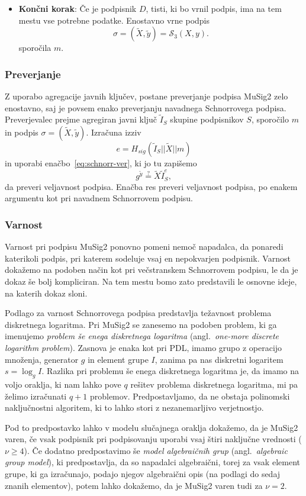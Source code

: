 \documentclass[isrm2, tisk]{fmfdelo}
\begin{document}
\begin{itemize}
    \item \textbf{Končni korak}:
        Če je podpisnik $D$, tisti, ki bo vrnil podpis, ima na tem mestu vse potrebne podatke.
        Enostavno vrne podpis
        $$
        \sigma = (\tilde{X}, \tilde{y}) = \mathcal{S}_3(X, y).
        $$
        sporočila $m$.
\end{itemize}

\subsubsection{Preverjanje}
Z uporabo agregacije javnih ključev, postane preverjanje podpisa MuSig2 zelo enostavno, saj je
povsem enako preverjanju navadnega Schnorrovega podpisa. Preverjevalec prejme agregiran javni ključ
$\tilde{I}_S$ skupine podpisnikov $S$, sporočilo $m$ in podpis $\sigma = (\tilde{X}, \tilde{y})$.
Izračuna izziv
$$
e = H_{sig}(\tilde{I}_S || \tilde{X} || m)
$$ in uporabi enačbo~\eqref{eq:schnorr-ver}, ki jo tu zapišemo
$$
g^{\tilde{y}} \stackrel{?}{=} \tilde{X} \tilde{I}_S^e,
$$
da preveri veljavnost podpisa. Enačba res preveri veljavnost podpisa, po enakem argumentu kot pri
navadnem Schnorrovem podpisu.

\subsubsection{Varnost}
Varnost pri podpisu MuSig2 ponovno pomeni nemoč napadalca, da ponaredi katerikoli podpis, pri katerem
sodeluje vsaj en nepokvarjen podpisnik. Varnost dokažemo na podoben način kot pri večstranskem Schnorrovem
podpisu, le da je dokaz še bolj kompliciran. Na tem mestu bomo zato predstavili le osnovne ideje,
na katerih dokaz sloni.

Podlago za varnost Schnorrovega podpisa predstavlja težavnost problema diskretnega logaritma. Pri
MuSig2 se zanesemo na podoben problem, ki ga imenujemo \textit{problem še enega diskretnega logaritma}
(angl.\ \textit{one-more discrete logarithm problem}). Zasnova je enaka kot pri PDL, imamo grupo z
operacijo množenja, generator $g$ in element grupe $I$, zanima pa nas diskretni logaritem
$s = \log_g I$. Razlika pri problemu še enega diskretnega logaritma je, da imamo na voljo oraklja,
ki nam lahko pove $q$ rešitev problema diskretnega logaritma, mi pa želimo izračunati $q + 1$ problemov.
Predpostavljamo, da ne obstaja polinomski naključnostni algoritem, ki to lahko stori z nezanemarljivo
verjetnostjo.

Pod to predpostavko lahko v modelu slučajnega oraklja dokažemo, da je MuSig2 varen, če vsak podpisnik
pri podpisovanju uporabi vsaj štiri naključne vrednosti ($\nu \geq 4$). Če dodatno predpostavimo še
\textit{model algebraičnih grup} (angl.\ \textit{algebraic group model}), ki predpostavlja, da so
napadalci algebraični, torej za vsak element grupe, ki ga izračunajo, podajo njegov algebraični
opis (na podlagi do sedaj znanih elementov), potem lahko dokažemo, da je MuSig2 varen tudi za $\nu = 2$.
\end{document}
